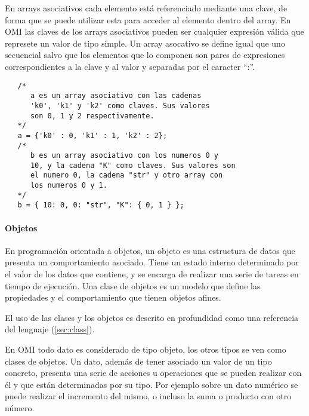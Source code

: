 En arrays asociativos cada elemento está referenciado mediante una clave, de forma que se puede utilizar esta para acceder al elemento dentro del array. En OMI las claves 
de los arrays asociativos pueden ser cualquier expresión válida que represete un valor de tipo simple. Un array asocativo se define igual que uno secuencial salvo que los elementos que lo
componen son pares de expresiones correspondientes a la clave y al valor y separadas por el caracter ``:''. \\

\begin{lstlisting}
   /*
      a es un array asociativo con las cadenas
      'k0', 'k1' y 'k2' como claves. Sus valores 
      son 0, 1 y 2 respectivamente.
   */
   a = {'k0' : 0, 'k1' : 1, 'k2' : 2};
   /* 
      b es un array asociativo con los numeros 0 y
      10, y la cadena "K" como claves. Sus valores son
      el numero 0, la cadena "str" y otro array con 
      los numeros 0 y 1.
   */
   b = { 10: 0, 0: "str", "K": { 0, 1 } }; 
\end{lstlisting}


\paragraph{Objetos} \label{sec:type_object}
En programación orientada a objetos, un objeto es una estructura de datos que presenta un comportamiento asociado. Tiene un estado interno 
determinado por el valor de los datos que contiene, y se encarga de realizar una serie de tareas en tiempo de ejecución. Una clase de objetos es un
modelo que define las propiedades y el comportamiento que tienen objetos afines. 

El uso de las clases y los objetos es descrito en profundidad como una referencia del lenguaje (\autoref{sec:class}).


En OMI todo dato es considerado de tipo objeto, los otros tipos se ven como clases de objetos. Un dato, además de tener asociado un valor de un tipo concreto, 
presenta  una serie de acciones u operaciones que se pueden realizar con él y que están determinadas por su tipo. Por ejemplo sobre un dato numérico se
puede realizar el incremento del mismo, o incluso la suma o producto con otro número. \\

